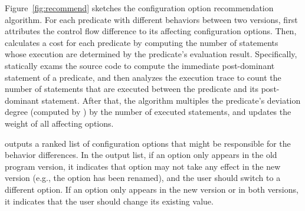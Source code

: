 Figure~\ref{fig:recommend} sketches the configuration option
recommendation algorithm.
For each predicate with different behaviors between two
versions, \ourtool first attributes the control flow difference 
to its affecting configuration options. Then,
\ourtool calculates a cost for each predicate by computing
the number of statements whose execution are determined
by the predicate's evaluation result. Specifically,
\ourtool statically exams the source code to compute
the immediate post-dominant statement of a predicate, and then
analyzes the execution trace to count the number of statements that
are executed between the predicate and its post-dominant
statement. After that, the algorithm multiples the predicate's deviation
degree (computed by ) by the number of executed statements,
and updates the weight of all affecting options.

\ourtool outputs a ranked list of
configuration options that might be responsible for the
behavior differences. In the output list, if an option only appears
in the old program version, it indicates that option may not
take any effect in the new version (e.g., the option has
been renamed), and the user should switch to a different option.
If an option only appears in the new version or in both
versions, it indicates that the user should change its
existing value.








